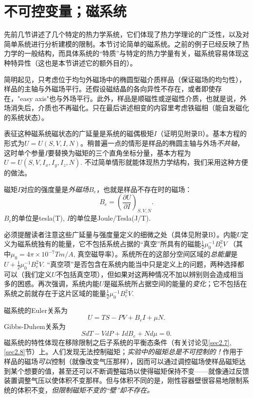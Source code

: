 \section{不可控变量；磁系统}
\label{sec3.8}
先前几节讲述了几个特定的热力学系统，它们体现了热力学理论的广泛性，以及对简单系统进行分析建模的限制。本节讨论简单的磁系统。之前的例子已经反映了热力学的一般结构，而具体系统的“特质”与特定的热力学量有关，磁系统容易体现这种特异性（这也是本节讲述它的额外目的）。

简明起见，只考虑位于均匀外磁场中的椭圆型磁介质样品（保证磁场的均匀性），样品的主轴与外磁场平行。还假设磁结晶的各向异性不存在，或者即使存在，"easy axis"也与外场平行。此外，样品是顺磁性或逆磁性介质，也就是说，外场消失后，介质也不再磁化。只在最后讲述相变的内容里考虑铁磁相（能自发磁化的系统状态）。

表征这种磁系统磁状态的广延量是系统的磁偶极矩$I$（证明见附录B）。基本方程的形式为$U = U(S, V, I, N)$。稍普遍一点的情形是样品的椭圆主轴与外场{\it 不共轴}，这时单个参量$I$要替换为磁矩的三个直角坐标分量，基本方程为$U = U(S, V, I_x, I_y, I_z, N)$. 不过简单情形就能体现热力学结构，我们采用这种方便的做法。

磁矩$I$对应的强度量是{\it 外磁场}$B_e$，也就是样品不存在时的磁场：
\begin{equation}
    B_e = \left( \frac{\partial U}{\partial I} \right)_{S, V, N}.
\label{equ3.63}
\end{equation}
$B_e$的单位是tesla(T), $I$的单位是Joule/Tesla(J/T).

必须提醒读者注意这些广延量与强度量定义的细微之处（具体见附录B）。内能$U$定义为磁系统独有的能量，它不包括系统占据的“真空”所具有的磁能$\frac{1}{2} \mu_0^{-1} B_e^2 V$ （其中$\mu_0 = 4\pi \times 10^{-7} \si{T m / A}$, 真空磁导率）。系统所在的这部分空间区域的{\it 总能量}是$U + \frac{1}{2} \mu_0^{-1} B_e^2 V$. “真空项”是否包含在系统内能当中只是定义上的问题，两种选择都可以（我们定义$U$不包括真空项），但如果对这两种情况不加以辨别则会造成相当多的困惑。再次强调，系统内能$U$是磁系统所占据空间的能量的{\it 变化}；它不包括在系统之前就存在于这片区域的能量$\frac{1}{2} \mu_0^{-1} B_e^2 V$.

磁系统的Euler关系为
\begin{equation}
    U = TS - PV + B_e I + \mu N.
\label{equ3.64}
\end{equation}
Gibbs-Duhem关系为
\begin{equation}
    SdT - VdP + IdB_e + Nd\mu = 0.
\label{equ3.65}
\end{equation}
磁系统的特性体现在移除限制之后子系统的平衡态条件（有关讨论见\ref{sec2.7}, \ref{sec2.8}节）上。人们发现无法控制磁矩；{\it 实验中的磁矩总是不可控制的！}作用于样品的磁场{\it 可以}控制（就像改变气压那样），因而可以通过调控磁场使样品磁矩达到某个想要的值，甚至还可以不断调整磁场以使得磁矩保持不变——就像通过反馈装置调整气压以使体积不变那样。但与体积不同的是，刚性容器壁很容易地限制系统的体积不变，{\it 但限制磁矩不变的“壁”却不存在。}

